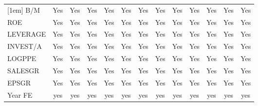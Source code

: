 \begin{table}[htbp]
\begin{tabular}{l*{12}{c}}
[1em]
B/M                 &         Yes         &         Yes         &         Yes         &         Yes         &         Yes         &         Yes         &         Yes         &         Yes         &         Yes         &         Yes         &         Yes         &         Yes         \\
[1em]
ROE                 &         Yes         &         Yes         &         Yes         &         Yes         &         Yes         &         Yes         &         Yes         &         Yes         &         Yes         &         Yes         &         Yes         &         Yes         \\
[1em]
LEVERAGE            &         Yes         &         Yes         &         Yes         &         Yes         &         Yes         &         Yes         &         Yes         &         Yes         &         Yes         &         Yes         &         Yes         &         Yes         \\
[1em]
INVEST/A            &         Yes         &         Yes         &         Yes         &         Yes         &         Yes         &         Yes         &         Yes         &         Yes         &         Yes         &         Yes         &         Yes         &         Yes         \\
[1em]
LOGPPE              &         Yes         &         Yes         &         Yes         &         Yes         &         Yes         &         Yes         &         Yes         &         Yes         &         Yes         &         Yes         &         Yes         &         Yes         \\
[1em]
SALESGR             &         Yes         &         Yes         &         Yes         &         Yes         &         Yes         &         Yes         &         Yes         &         Yes         &         Yes         &         Yes         &         Yes         &         Yes         \\
[1em]
EPSGR               &         Yes         &         Yes         &         Yes         &         Yes         &         Yes         &         Yes         &         Yes         &         Yes         &         Yes         &         Yes         &         Yes         &         Yes         \\
\hline
Year FE             &         yes         &         yes         &         yes         &         yes         &         yes         &         yes         &         yes         &         yes         &         yes         &         yes         &         yes         &         yes         \\

\end{tabular}
\end{table}
